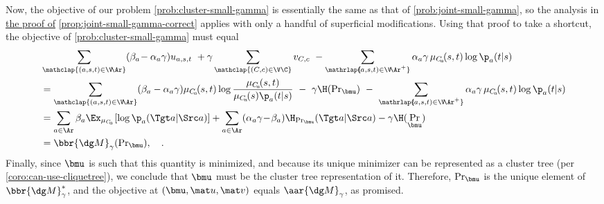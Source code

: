 \begin{lproof}
    Now, the objective of our problem \eqref{prob:cluster-small-gamma} is essentially the same as that of \eqref{prob:joint-small-gamma}, so the analysis in \hyperref[proof:joint-small-gamma-correct]{the proof of} \cref{prop:joint-small-gamma-correct} applies with only a handful of superficial modifications. 
    Using that proof to take a shortcut, the objective of \eqref{prob:cluster-small-gamma} must equal
    \begin{align*}
        &\sum_{\mathclap{(a,s,t) \in \V\!\Ar}}
            (\beta_a \!- \alpha_a \gamma) u_{a,s,t}
        ~+ \gamma \sum_{\mathclap{(C,c) \in \V\C}} v_{C,c}
        ~- \sum_{\mathrlap{\!\!\!(a,s,t) \in \smash{\V\!\Ar^+}}}
            \alpha_a\gamma \, \mu_{C_{\!a}}\!(s,t) \log \p_a (t|s) \\
    &=
        \sum_{\mathclap{(a,s,t) \in \V\!\Ar}}
             (\beta_a - \alpha_a\gamma) \mu_{C_{\!a}}\!(s,t) \log \frac{\mu_{C_{\!a}}\!(s,t)}{\mu_{C_{\!a}}\!(s)\p_a(t|s)}
        ~-~ \gamma \H(\Pr\nolimits_{\bmu})
        ~-~ \sum_{\mathrlap{\!\!\!(a,s,t) \in \smash{\V\!\Ar^+}}}
            \alpha_a\gamma \, \mu_{C_{\!a}}\!(s,t) \log \p_a (t|s) \\
    &= 
        \sum_{a \in \Ar} \beta_a
           \Ex_{\mu_{C_{\!a}}}[ \log \p_a(\Tgt a | \Src a)]
        + \sum_{a \in \Ar} (\alpha_a \gamma \!-\! \beta_a)
           \H_{\Pr_{\bmu}}(\Tgt a | \Src a)
        - \gamma \H(\Pr_{\bmu})  \\
    &= \bbr{\dg M}_\gamma(\Pr\nolimits_{\bmu}),
    \quad.
    \end{align*}
    Finally, since $\bmu$ is such that this quantity is minimized, and because 
    its unique minimizer can be represented as a cluster tree (per \cref{coro:can-use-cliquetree}), we conclude that $\bmu$ must be the cluster tree representation of it.
    Therefore, $\Pr_{\bmu}$ is the unique element of $\bbr{\dg M}^*_\gamma$, and the objective at $(\bmu, \mat u, \mat v)$ equals $\aar{\dg M}_\gamma$, as promised.
\end{lproof}

